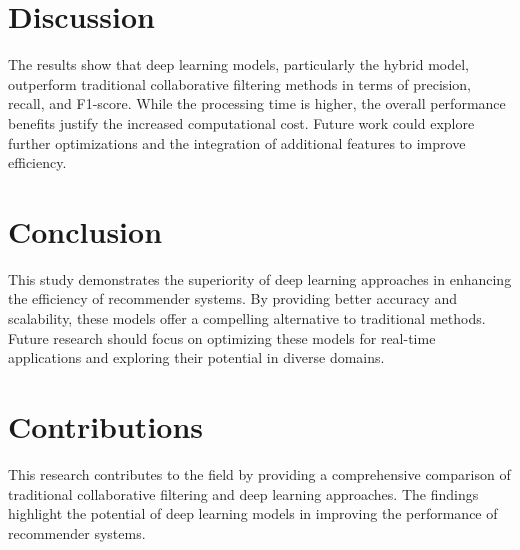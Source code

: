 \documentclass{article}
\begin{document}
\section{Discussion}
The results show that deep learning models, particularly the hybrid model, outperform traditional collaborative filtering methods in terms of precision, recall, and F1-score. While the processing time is higher, the overall performance benefits justify the increased computational cost. Future work could explore further optimizations and the integration of additional features to improve efficiency.

\section{Conclusion}
This study demonstrates the superiority of deep learning approaches in enhancing the efficiency of recommender systems. By providing better accuracy and scalability, these models offer a compelling alternative to traditional methods. Future research should focus on optimizing these models for real-time applications and exploring their potential in diverse domains.

\section{Contributions}
This research contributes to the field by providing a comprehensive comparison of traditional collaborative filtering and deep learning approaches. The findings highlight the potential of deep learning models in improving the performance of recommender systems.
\end{document}
